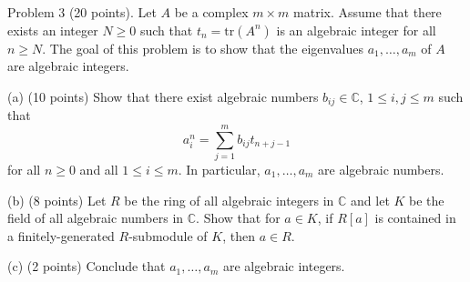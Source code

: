 \begin{exercise}
\label{algebra:2016:3}
Problem 3 (20 points). Let $A$ be a complex $m \times m$ matrix. Assume that there exists an integer $N \geq 0$ such that $t_n = \mathrm{tr}(A^n)$ is an algebraic integer for all $n \geq N$. The goal of this problem is to show that the eigenvalues $a_1, \ldots, a_m$ of $A$ are algebraic integers.

(a) (10 points) Show that there exist algebraic numbers $b_{ij} \in \mathbb{C}$, $1 \leq i, j \leq m$ such that
$$a_i^n = \sum_{j=1}^m b_{ij} t_{n+j-1}$$
for all $n \geq 0$ and all $1 \leq i \leq m$. In particular, $a_1, \ldots, a_m$ are algebraic numbers.

(b) (8 points) Let $R$ be the ring of all algebraic integers in $\mathbb{C}$ and let $K$ be the field of all algebraic numbers in $\mathbb{C}$. Show that for $a \in K$, if $R[a]$ is contained in a finitely-generated $R$-submodule of $K$, then $a \in R$.

(c) (2 points) Conclude that $a_1, \ldots, a_m$ are algebraic integers.
\end{exercise}
